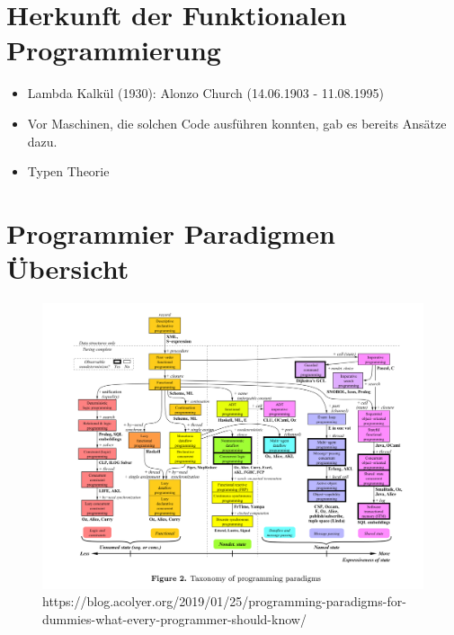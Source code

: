 \documentclass{beamer}
\begin{document}
\section{Herkunft der Funktionalen Programmierung}
\begin{frame}
	
	\begin{itemize}
		\item Lambda Kalkül (1930): Alonzo Church (14.06.1903 - 11.08.1995)  
		\item Vor Maschinen, die solchen Code ausführen konnten, gab es bereits Ansätze dazu.
            \item Typen Theorie
	\end{itemize}
	
\end{frame}

\section{Programmier Paradigmen Übersicht}
\begin{frame}
	\begin{figure}
	    \centering
	    \includegraphics[width=0.9\linewidth]{bilder/Programming-paradigms.png}
	    \textmd{ \tiny https://blog.acolyer.org/2019/01/25/programming-paradigms-for-dummies-what-every-programmer-should-know/}
	\end{figure}
\end{frame}
\end{document}
